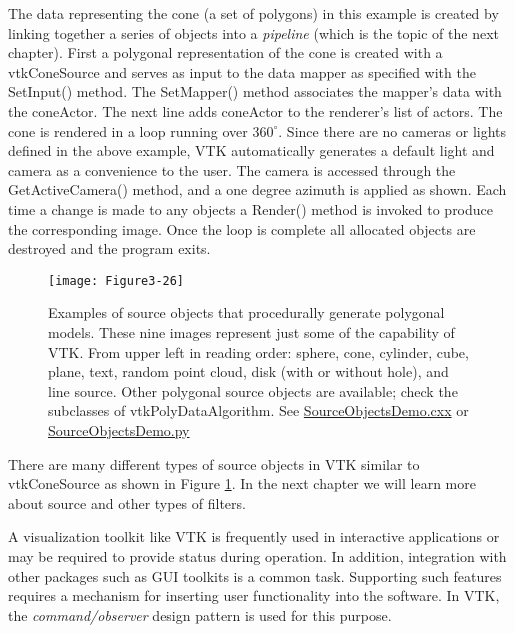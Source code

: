 \begin{description}[leftmargin=0cm,labelindent=0cm]
The data representing the cone (a set of polygons) in this example is created by linking together a series of objects into a \emph{pipeline} (which is the topic of the next chapter). First a polygonal representation of the cone is created with a vtkConeSource and serves as input to the data mapper as specified with the SetInput() method. The SetMapper() method associates the mapper's data with the coneActor. The next line adds coneActor to the renderer's list of actors. The cone is rendered in a loop running over $360^\circ$. Since there are no cameras or lights defined in the above example, VTK automatically generates a default light and camera as a convenience to the user. The camera is accessed through the GetActiveCamera() method, and a one degree azimuth is applied as shown. Each time a change is made to any objects a Render() method is invoked to produce the corresponding image. Once the loop is complete all allocated objects are destroyed and the program exits.

\begin{figure}[!htb]
  \centering
  \texttt{[image: Figure3-26]}\\
  \caption{Examples of source objects that procedurally generate polygonal models. These nine images represent just some of the capability of VTK. From upper left in reading order: sphere, cone, cylinder, cube, plane, text, random point cloud, disk (with or without hole), and line source. Other polygonal source objects are available; check the subclasses of vtkPolyDataAlgorithm. See  \href{https://lorensen.github.io/VTKExamples/site/Cxx/GeometricObjects/SourceObjectsDemo/}{SourceObjectsDemo.cxx} or \href{https://lorensen.github.io/VTKExamples/site/Python/GeometricObjects/SourceObjectsDemo/}{SourceObjectsDemo.py}}\label{fig:Figure3-26}
\end{figure}

There are many different types of source objects in VTK similar to vtkConeSource as shown in Figure \ref{fig:Figure3-26}. In the next chapter we will learn more about source and other types of filters.

\item[Events and Observers.]
\label{sub:examples_events_observers}

A visualization toolkit like VTK is frequently used in interactive applications or may be required to provide status during operation. In addition, integration with other packages such as GUI toolkits is a common task. Supporting such features requires a mechanism for inserting user functionality into the software. In VTK, the \emph{command/observer}
 design pattern \cite{Gamma95} is used for this purpose.


\end{description}
